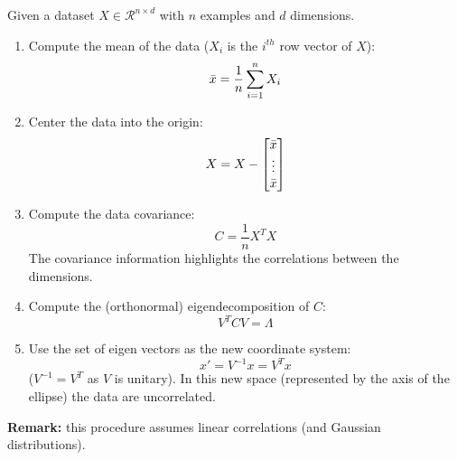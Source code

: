 Given a dataset $X \in \mathcal{R}^{n \times d}$ with $n$ examples and $d$ dimensions.

\begin{enumerate}
	\item Compute the mean of the data ($X_{i}$ is the $i^{th}$ row vector of $X$):
		\begin{equation*}
			\Bar{x}= \frac{1}{n}\sum_{i=1}^{n}X_{i}
		\end{equation*}

	\item Center the data into the origin:
		\begin{equation*}
			X = X -
			\begin{bmatrix}
				\Bar{x} \\
				\vdots  \\
				\Bar{x}
			\end{bmatrix}
		\end{equation*}

	\item Compute the data covariance:
		\begin{equation*}
			C = \frac{1}{n}X^{T}X
		\end{equation*}
		The covariance information highlights the correlations between the
		dimensions.

	\item Compute the (orthonormal) eigendecomposition of $C$:
		\begin{equation*}
			V^{T}C V = \Lambda
		\end{equation*}

	\item Use the set of eigen vectors as the new coordinate system:
		\begin{equation*}
			x' = V^{-1}x = V^{T}x
		\end{equation*}
		($V^{-1}= V^{T}$ as $V$ is unitary). In this new space (represented by the
		axis of the ellipse) the data are uncorrelated.
\end{enumerate}

\textbf{Remark:} this procedure assumes linear correlations (and Gaussian
distributions).


